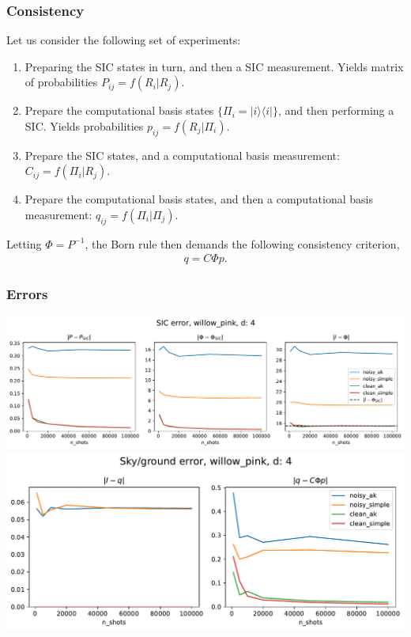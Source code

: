 \documentclass{beamer}
\begin{document}
\begin{frame}
\frametitle{Consistency}
Let us consider the following set of experiments:
\begin{enumerate}
\item Preparing the SIC states in turn, and then a SIC measurement. Yields matrix of probabilities $P_{ij}=f(R_i|R_j)$.
\item Prepare the computational basis states $\{\Pi_i=|i\rangle\langle i|\}$, and then performing a SIC. Yields probabilities $p_{ij} = f(R_j|\Pi_i)$.
\item Prepare the SIC states, and a computational basis measurement: $C_{ij}=f(\Pi_i|R_j)$.
\item Prepare the computational basis states, and then a computational basis measurement: $q_{ij}=f(\Pi_i|\Pi_j)$.
\end{enumerate}
	Letting $\Phi=P^{-1}$, the Born rule then demands the following consistency criterion,
\begin{align}
q = C\Phi p.	
\end{align}
\end{frame}

\begin{frame}
\frametitle{Errors}
\begin{center}
\includegraphics[scale=0.36]{img/sic_metrics}	
\includegraphics[scale=0.36]{img/sg_metrics}	
\end{center}	
\end{frame}
\end{document}
